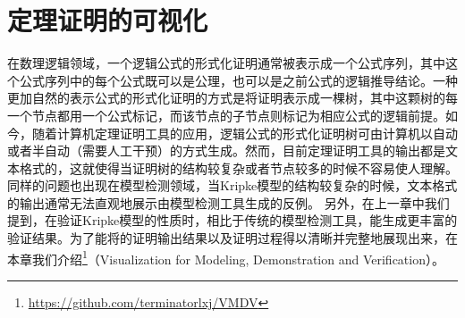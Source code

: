 \chapter{定理证明的可视化}\label{chapt:visulization}
在数理逻辑领域，一个逻辑公式的形式化证明通常被表示成一个公式序列，其中这个公式序列中的每个公式既可以是公理，也可以是之前公式的逻辑推导结论。一种更加自然的表示公式的形式化证明的方式是将证明表示成一棵树，其中这颗树的每一个节点都用一个公式标记，而该节点的子节点则标记为相应公式的逻辑前提。如今，随着计算机定理证明工具的应用，逻辑公式的形式化证明树可由计算机以自动或者半自动（需要人工干预）的方式生成。然而，目前定理证明工具的输出都是文本格式的，这就使得当证明树的结构较复杂或者节点较多的时候不容易使人理解。同样的问题也出现在模型检测领域，当Kripke模型的结构较复杂的时候，文本格式的输出通常无法直观地展示由模型检测工具生成的反例。
另外，在上一章中我们提到，\sctlprov{}在验证Kripke模型的性质时，相比于传统的模型检测工具，能生成更丰富的验证结果。为了能将\sctlprov{}的证明输出结果以及证明过程得以清晰并完整地展现出来，在本章我们介绍\footnote{\url{https://github.com/terminatorlxj/VMDV}}（Visualization for Modeling, Demonstration and Verification）。

